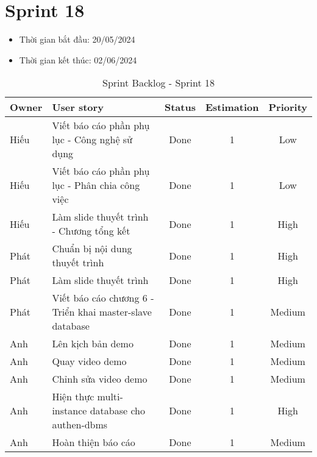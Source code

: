 \section{Sprint 18}
\begin{itemize}
    \item Thời gian bắt đầu: 20/05/2024
    \item Thời gian kết thúc: 02/06/2024
\end{itemize}
\begin{table}[H]
    \begin{tabular}{|m{2.5cm}|m{6cm}|c|c|c|}
    \hline
    \textbf{Owner}  & \textbf{User story}                                & \textbf{Status} & \textbf{Estimation} & \textbf{Priority} \\ \hline
    Hiếu                & Viết báo cáo phần phụ lục - Công nghệ sử dụng                & Done            & 1                   & Low        \\ \hline
    Hiếu               & Viết báo cáo phần phụ lục - Phân chia công việc                & Done            & 1                   & Low         \\ \hline
    Hiếu                & Làm slide thuyết trình  - Chương tổng kết                  & Done            & 1                   & High         \\ \hline
    Phát              & Chuẩn bị nội dung thuyết trình                & Done            & 1                   & High         \\ \hline
    Phát               & Làm slide thuyết trình                 & Done            & 1                   & High         \\ \hline
    Phát               & Viết báo cáo chương 6 - Triển khai master-slave database               & Done            & 1                   & Medium         \\ \hline
    Anh               & Lên kịch bản demo               & Done            & 1                   & Medium         \\ \hline
    Anh               & Quay video demo               & Done            & 1                   & Medium         \\ \hline
    Anh               & Chỉnh sửa video demo                & Done            & 1                   & Medium         \\ \hline
    Anh               & Hiện thực multi-instance database cho authen-dbms                & Done            & 1                   & High         \\ \hline
    Anh               & Hoàn thiện báo cáo                & Done            & 1                   & Medium         \\ \hline
    \end{tabular}
    \caption{Sprint Backlog - Sprint 18}
    \label{tab:sprint-18}
\end{table}